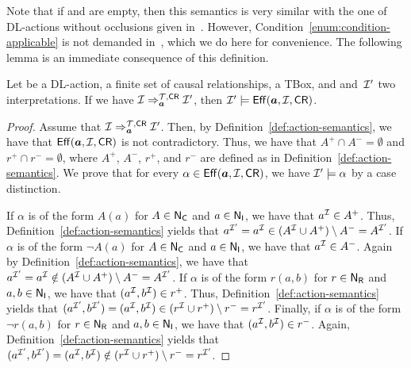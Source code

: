 \noindent
Note that if \Tmc and \CR are empty, then this semantics is very similar with
the one of DL-actions without occlusions given in~\cite{BLM+-AAAI05}.  However,
Condition~\ref{enum:condition-applicable} is not demanded in~\cite{BLM+-AAAI05},
which we do here for convenience.
%
The following lemma is an immediate consequence of this definition.

\begin{lemma}\label{lem:models-effects}
    Let \abf be a DL-action, \CR a finite set of causal relationships, \Tmc a
    TBox, and \Imc and~$\mathcal{I}'$ two interpretations.
    If we have $\mathcal{I}\Rightarrow_{\boldsymbol a}^{\mathcal{T},\mathsf{CR}}\mathcal{I}'$, then
    $\mathcal{I}'\models\operatorname{\mathsf{Eff}}(\boldsymbol a,\mathcal{I},\mathsf{CR})$.
\end{lemma}

\begin{proof}
    Assume that $\mathcal{I}\Rightarrow_{\boldsymbol a}^{\mathcal{T},\mathsf{CR}}\mathcal{I}'$.  Then, by
    Definition~\ref{def:action-semantics}, we have that
    $\operatorname{\mathsf{Eff}}(\boldsymbol a,\mathcal{I},\mathsf{CR})$ is not contradictory.  Thus, we have that
    $A^+\cap A^-=\emptyset$ and $r^+\cap r^-=\emptyset$, where $A^+$, $A^-$,
    $r^+$, and $r^-$ are defined as in Definition~\ref{def:action-semantics}.
    We prove that for every $\alpha\in\operatorname{\mathsf{Eff}}(\boldsymbol a,\mathcal{I},\mathsf{CR})$, we have
    $\mathcal{I}'\models\alpha$ by a case distinction.

    If $\alpha$ is of the form $A(a)$ for $A\in\mathsf{N_C}$ and $a\in\mathsf{N_I}$, we have that
    $a^\mathcal{I}\in A^+$.  Thus, Definition~\ref{def:action-semantics} yields that
    $a^{\mathcal{I}'}=a^\mathcal{I}\in(A^\mathcal{I}\cup A^+)\setminus A^-=A^{\mathcal{I}'}$.
    If $\alpha$ is of the form $\lnot A(a)$ for $A\in\mathsf{N_C}$ and $a\in\mathsf{N_I}$, we have
    that $a^\mathcal{I}\in A^-$.  Again by Definition~\ref{def:action-semantics}, we
    have that $a^{\mathcal{I}'}=a^\mathcal{I}\notin(A^\mathcal{I}\cup A^+)\setminus A^-=A^{\mathcal{I}'}$.
    If $\alpha$ is of the form $r(a,b)$ for $r\in\mathsf{N_R}$ and $a,b\in\mathsf{N_I}$, we have that
    $(a^\mathcal{I},b^\mathcal{I})\in r^+$.  Thus, Definition~\ref{def:action-semantics}
    yields that
    $(a^{\mathcal{I}'},b^{\mathcal{I}'})=(a^\mathcal{I},b^\mathcal{I})\in(r^\mathcal{I}\cup r^+)\setminus r^-=r^{\mathcal{I}'}$.
    Finally, if $\alpha$ is of the form $\lnot r(a,b)$ for $r\in\mathsf{N_R}$ and
    $a,b\in\mathsf{N_I}$, we have that $(a^\mathcal{I},b^\mathcal{I})\in r^-$.
    Again, Definition~\ref{def:action-semantics} yields that
    $(a^{\mathcal{I}'},b^{\mathcal{I}'})=(a^\mathcal{I},b^\mathcal{I})\notin(r^\mathcal{I}\cup r^+)\setminus r^-=r^{\mathcal{I}'}$.
\end{proof}

